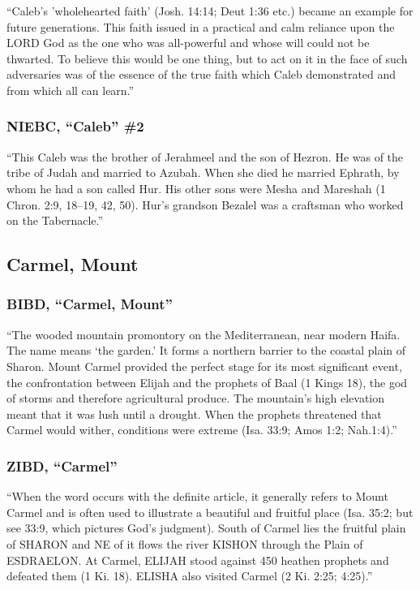 			``Caleb's 'wholehearted faith' (Josh. 14:14; Deut 1:36 etc.) became an example for future generations. This faith issued in a practical and calm reliance upon the LORD God as the one who was all-powerful and whose will could not be thwarted. To believe this would be one thing, but to act on it in the face of such adversaries was of the essence of the true faith which Caleb demonstrated and from which all can learn.''
			
		\subsubsection{NIEBC, ``Caleb'' \#2}
		
			``This Caleb was the brother of Jerahmeel and the son of Hezron. He was of the tribe of Judah and married to Azubah. When she died he married Ephrath, by whom he had a son called Hur. His other sons were Mesha and Mareshah (1 Chron. 2:9, 18--19, 42, 50). Hur's grandson Bezalel was a craftsman who worked on the Tabernacle.''
			
	\subsection{Carmel, Mount} %
		\label{CARMEL}
		\label{MOUNTCARMEL}
		
		\subsubsection{BIBD, ``Carmel, Mount''}
		
			``The wooded mountain promontory on the Mediterranean, near modern Haifa. The name means `the garden.' It forms a northern barrier to the coastal plain of Sharon. Mount Carmel provided the perfect stage for its most significant event, the confrontation between Elijah and the prophets of Baal (1 Kings 18), the god of storms and therefore agricultural produce. The mountain's high elevation meant that it was lush until a drought. When the prophets threatened that Carmel would wither, conditions were extreme (Isa. 33:9; Amos 1:2; Nah.1:4).''
			
		\subsubsection{ZIBD, ``Carmel''}
		
			``When the word occurs with the definite article, it generally refers to Mount Carmel and is often used to illustrate a beautiful and fruitful place (Isa. 35:2; but see 33:9, which pictures God's judgment). South of Carmel lies the fruitful plain of SHARON and NE of it flows the river KISHON through the Plain of ESDRAELON. At Carmel, ELIJAH stood against 450 heathen prophets and defeated them (1 Ki. 18). ELISHA also visited Carmel (2 Ki. 2:25; 4:25).''
			
